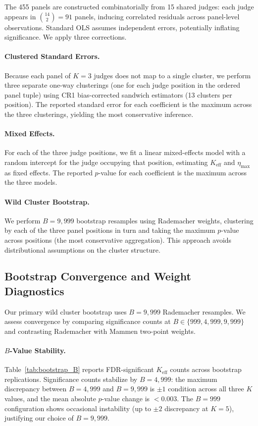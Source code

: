 The 455 panels are constructed combinatorially from 15 shared judges: each judge appears in $\binom{14}{2} = 91$ panels, inducing correlated residuals across panel-level observations. Standard OLS assumes independent errors, potentially inflating significance. We apply three corrections.

\paragraph{Clustered Standard Errors.} Because each panel of $K{=}3$ judges does not map to a single cluster, we perform three separate one-way clusterings (one for each judge position in the ordered panel tuple) using CR1 bias-corrected sandwich estimators (13 clusters per position). The reported standard error for each coefficient is the maximum across the three clusterings, yielding the most conservative inference.

\paragraph{Mixed Effects.} For each of the three judge positions, we fit a linear mixed-effects model with a random intercept for the judge occupying that position, estimating $K_{\mathrm{eff}}$ and $\eta_{\max}$ as fixed effects. The reported $p$-value for each coefficient is the maximum across the three models.

\paragraph{Wild Cluster Bootstrap.} We perform $B{=}9{,}999$ bootstrap resamples using Rademacher weights, clustering by each of the three panel positions in turn and taking the maximum $p$-value across positions (the most conservative aggregation). This approach avoids distributional assumptions on the cluster structure.

\subsection{Bootstrap Convergence and Weight Diagnostics}
\label{app:bootstrap_convergence}

Our primary wild cluster bootstrap uses $B{=}9{,}999$ Rademacher resamples. We assess convergence by comparing significance counts at $B \in \{999, 4{,}999, 9{,}999\}$ and contrasting Rademacher with Mammen two-point weights.

\paragraph{$B$-Value Stability.} Table~\ref{tab:bootstrap_B} reports FDR-significant $K_{\mathrm{eff}}$ counts across bootstrap replications. Significance counts stabilize by $B{=}4{,}999$: the maximum discrepancy between $B{=}4{,}999$ and $B{=}9{,}999$ is $\pm 1$ condition across all three $K$ values, and the mean absolute $p$-value change is ${<}0.003$. The $B{=}999$ configuration shows occasional instability (up to $\pm 2$ discrepancy at $K{=}5$), justifying our choice of $B{=}9{,}999$.

